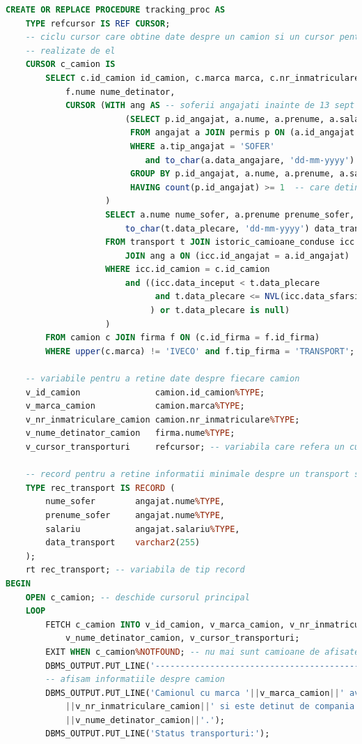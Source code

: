 \documentclass[12pt, a4paper]{article}
\begin{document}
\begin{lstlisting}[language=SQL]
CREATE OR REPLACE PROCEDURE tracking_proc AS
    TYPE refcursor IS REF CURSOR;
    -- ciclu cursor care obtine date despre un camion si un cursor pentru transporturile
    -- realizate de el
    CURSOR c_camion IS
        SELECT c.id_camion id_camion, c.marca marca, c.nr_inmatriculare nr_inmatriculare,
            f.nume nume_detinator,
            CURSOR (WITH ang AS -- soferii angajati inainte de 13 sept 2020 care detin cel mult 2 permise auto
                        (SELECT p.id_angajat, a.nume, a.prenume, a.salariu
                         FROM angajat a JOIN permis p ON (a.id_angajat = p.id_angajat)
                         WHERE a.tip_angajat = 'SOFER'
                            and to_char(a.data_angajare, 'dd-mm-yyyy') < '13-9-2020' 
                         GROUP BY p.id_angajat, a.nume, a.prenume, a.salariu
                         HAVING count(p.id_angajat) >= 1  -- care detine cel putin 1 permis  
                    )
                    SELECT a.nume nume_sofer, a.prenume prenume_sofer, a.salariu salariu_sofer,
                        to_char(t.data_plecare, 'dd-mm-yyyy') data_transport
                    FROM transport t JOIN istoric_camioane_conduse icc ON (t.id_camion = icc.id_camion)
                        JOIN ang a ON (icc.id_angajat = a.id_angajat)
                    WHERE icc.id_camion = c.id_camion
                        and ((icc.data_inceput < t.data_plecare 
                              and t.data_plecare <= NVL(icc.data_sfarsit, sysdate)
                             ) or t.data_plecare is null)
                    )
        FROM camion c JOIN firma f ON (c.id_firma = f.id_firma)
        WHERE upper(c.marca) != 'IVECO' and f.tip_firma = 'TRANSPORT';
        
    -- variabile pentru a retine date despre fiecare camion
    v_id_camion               camion.id_camion%TYPE;
    v_marca_camion            camion.marca%TYPE;
    v_nr_inmatriculare_camion camion.nr_inmatriculare%TYPE;
    v_nume_detinator_camion   firma.nume%TYPE;
    v_cursor_transporturi     refcursor; -- variabila care refera un cursor
    
    -- record pentru a retine informatii minimale despre un transport si sofer
    TYPE rec_transport IS RECORD (
        nume_sofer        angajat.nume%TYPE,
        prenume_sofer     angajat.nume%TYPE,
        salariu           angajat.salariu%TYPE,
        data_transport    varchar2(255)
    );
    rt rec_transport; -- variabila de tip record 
BEGIN
    OPEN c_camion; -- deschide cursorul principal
    LOOP
        FETCH c_camion INTO v_id_camion, v_marca_camion, v_nr_inmatriculare_camion,
            v_nume_detinator_camion, v_cursor_transporturi;
        EXIT WHEN c_camion%NOTFOUND; -- nu mai sunt camioane de afisate
        DBMS_OUTPUT.PUT_LINE('-----------------------------------------------'); -- separator
        -- afisam informatiile despre camion
        DBMS_OUTPUT.PUT_LINE('Camionul cu marca '||v_marca_camion||' avand nr. de inmatriculare '
            ||v_nr_inmatriculare_camion||' si este detinut de compania '
            ||v_nume_detinator_camion||'.');
        DBMS_OUTPUT.PUT_LINE('Status transporturi:');
        

\end{lstlisting}
\end{document}
